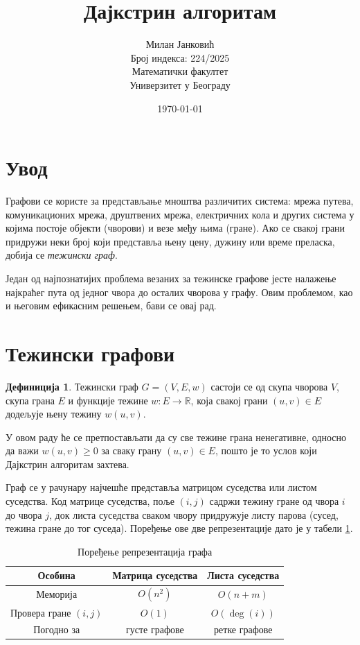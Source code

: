 \documentclass{article}
\title{Дајкстрин алгоритам}
\author{Милан Јанковић \\ Број индекса: 224/2025 \\ Математички факултет \\ Универзитет у Београду}
\date{\today}
\theoremstyle{definition}
\newtheorem{definicija}{Дефиниција}[section]
\begin{document}
\maketitle
\tableofcontents

\section*{Увод}

Графови се користе за представљање мноштва различитих система: мрежа путева, комуникационих мрежа, друштвених мрежа, електричних кола и других система у којима постоје објекти (чворови) и везе међу њима (гране). Ако се свакој грани придружи неки број који представља њену цену, дужину или време преласка, добија се \emph{тежински граф}.

Један од најпознатијих проблема везаних за тежинске графове јесте налажење најкраћег пута од једног чвора до осталих чворова у графу. Овим проблемом, као и његовим ефикасним решењем, бави се овај рад.

\section{Тежински графови}

\begin{definicija}
Тежински граф $G = (V, E, w)$ састоји се од скупа чворова $V$, скупа грана $E$ и функције тежине $w: E \to \mathbb{R}$, која свакој грани $(u, v) \in E$ додељује њену тежину $w(u, v)$.
\end{definicija}

У овом раду ће се претпостављати да су све тежине грана ненегативне, односно да важи $w(u, v) \geqslant 0$ за сваку грану $(u, v) \in E$, пошто је то услов који Дајкстрин алгоритам захтева.

Граф се у рачунару најчешће представља матрицом суседства или листом суседства. Код матрице суседства, поље $(i, j)$ садржи тежину гране од чвора $i$ до чвора $j$, док листа суседства сваком чвору придружује листу парова (сусед, тежина гране до тог суседа). Поређење ове две репрезентације дато је у табели \ref{tab:poredjenje}.

\begin{table}[h]
\centering
\begin{tabular}{c||c|c}
\textbf{Особина} & \textbf{Матрица суседства} & \textbf{Листа суседства} \\ \hline
Меморија & $O(n^2)$ & $O(n+m)$ \\
Провера гране $(i,j)$ & $O(1)$ & $O(\deg(i))$ \\
Погодно за & густе графове & ретке графове
\end{tabular}
\caption{Поређење репрезентација графа}
\label{tab:poredjenje}
\end{table}
\end{document}
